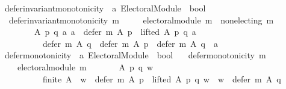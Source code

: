 \begin{isabellebody}
\isanewline
\isanewline
{}\isamarkupfalse%
\ defer{\isacharunderscore}{\kern0pt}invariant{\isacharunderscore}{\kern0pt}monotonicity\ {\isacharcolon}{\kern0pt}{\isacharcolon}{\kern0pt}\ {\isachardoublequoteopen}{\isacharprime}{\kern0pt}a\ Electoral{\isacharunderscore}{\kern0pt}Module\ {\isasymRightarrow}\ bool{\isachardoublequoteclose}\ \isanewline
\ \ {\isachardoublequoteopen}defer{\isacharunderscore}{\kern0pt}invariant{\isacharunderscore}{\kern0pt}monotonicity\ m\ {\isasymequiv}\isanewline
\ \ \ \ electoral{\isacharunderscore}{\kern0pt}module\ m\ {\isasymand}\ non{\isacharunderscore}{\kern0pt}electing\ m\ {\isasymand}\isanewline
\ \ \ \ \ \ \ \ {\isacharparenleft}{\kern0pt}{\isasymforall}A\ p\ q\ a{\isachardot}{\kern0pt}\ {\isacharparenleft}{\kern0pt}a\ {\isasymin}\ defer\ m\ A\ p\ {\isasymand}\ lifted\ A\ p\ q\ a{\isacharparenright}{\kern0pt}\ {\isasymlongrightarrow}\isanewline
\ \ \ \ \ \ \ \ \ \ {\isacharparenleft}{\kern0pt}defer\ m\ A\ q\ {\isacharequal}{\kern0pt}\ defer\ m\ A\ p\ {\isasymor}\ defer\ m\ A\ q\ {\isacharequal}{\kern0pt}\ {\isacharbraceleft}{\kern0pt}a{\isacharbraceright}{\kern0pt}{\isacharparenright}{\kern0pt}{\isacharparenright}{\kern0pt}{\isachardoublequoteclose}\isanewline
\isanewline
\isanewline
{}\isamarkupfalse%
\ defer{\isacharunderscore}{\kern0pt}monotonicity\ {\isacharcolon}{\kern0pt}{\isacharcolon}{\kern0pt}\ {\isachardoublequoteopen}{\isacharprime}{\kern0pt}a\ Electoral{\isacharunderscore}{\kern0pt}Module\ {\isasymRightarrow}\ bool{\isachardoublequoteclose}\ \isanewline
\ \ {\isachardoublequoteopen}defer{\isacharunderscore}{\kern0pt}monotonicity\ m\ {\isasymequiv}\isanewline
\ \ \ \ electoral{\isacharunderscore}{\kern0pt}module\ m\ {\isasymand}\isanewline
\ \ \ \ \ \ {\isacharparenleft}{\kern0pt}{\isasymforall}A\ p\ q\ w{\isachardot}{\kern0pt}\isanewline
\ \ \ \ \ \ \ \ \ \ {\isacharparenleft}{\kern0pt}finite\ A\ {\isasymand}\ w\ {\isasymin}\ defer\ m\ A\ p\ {\isasymand}\ lifted\ A\ p\ q\ w{\isacharparenright}{\kern0pt}\ {\isasymlongrightarrow}\ w\ {\isasymin}\ defer\ m\ A\ q{\isacharparenright}{\kern0pt}{\isachardoublequoteclose}\isanewline
\isanewline
%
\isadelimtheory
\isanewline
%
\endisadelimtheory
%
\isatagtheory
{}\isamarkupfalse%
%
\endisatagtheory
{\isafoldtheory}%
%
\isadelimtheory
%
\endisadelimtheory
%
\end{isabellebody}%
\endinput

